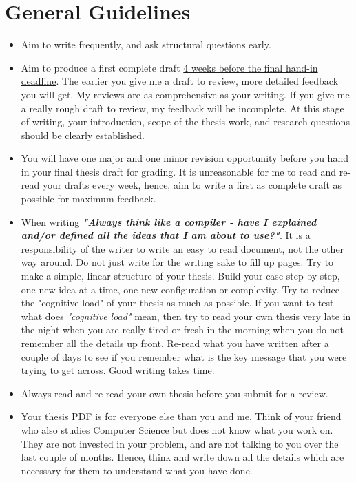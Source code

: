 \section*{General Guidelines}
\begin{itemize}
    \item Aim to write frequently, and ask structural questions early.
    
    \item Aim to produce a first complete draft \underline{4 weeks before the final hand-in deadline}. The earlier you 
    give me a draft to review, more detailed feedback you will get. My reviews are as comprehensive as your writing. 
    If you give me a really rough draft to review, my feedback will be incomplete. At this stage of writing, your introduction, 
    scope of the thesis work, and research questions should be clearly established.   
    
    \item You will have one major and one minor revision opportunity before you hand in your final thesis draft for grading. 
    It is unreasonable for me to read and re-read your drafts every week, hence, aim to write a first as complete 
    draft as possible for maximum feedback.
     
    \item When writing \textbf{\textit{"Always think like a compiler - have I explained and/or defined all the ideas that I am about to use?"}}. 
    It is a responsibility of the writer to write an easy to read document, not the other way around. Do not just 
    write for the writing sake to fill up pages. Try to make a simple, linear structure of your thesis. 
    Build your case step by step, one new idea at a time, one new configuration or complexity. Try 
    to reduce the "cognitive load" of your thesis as much as possible. If you want to test what 
    does \textit{"cognitive load"} mean, then try to read your own thesis very late in the night when you are really 
    tired or fresh in the morning when you do not remember all the details up front. Re-read what you have written 
    after a couple of days to see if you remember what is the key message that you were trying to get across.
    Good writing takes time.  
    
    \item Always read and re-read your own thesis before you submit for a review. 
    
    \item Your thesis PDF is for everyone else than you and me. Think of your friend who also studies Computer Science 
    but does not know what you work on. They are not invested in your problem, and are not talking to you over the 
    last couple of months. Hence, think and write down all the details which are necessary for them to understand 
    what you have done.
    

\end{itemize}
